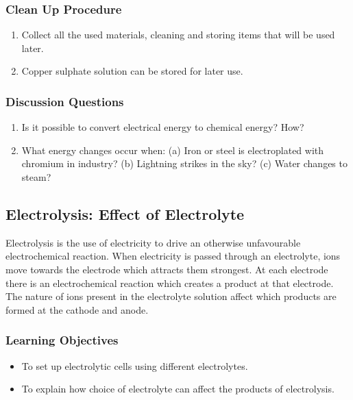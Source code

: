 \subsubsection*{Clean Up Procedure}
\begin{enumerate}
\item{Collect all the used materials, cleaning and storing items that will be used later.}
\item{Copper sulphate solution can be stored for later use.}
\end{enumerate}

\subsubsection*{Discussion Questions}
\begin{enumerate}
\item{Is it possible to convert electrical energy to chemical energy? How?}
\item{What energy changes occur when: (a) Iron or steel is electroplated with chromium in industry? (b) Lightning strikes in the sky? (c) Water changes to steam?}
\end{enumerate}


\subsection{Electrolysis: Effect of Electrolyte}

Electrolysis is the use of electricity to drive an otherwise unfavourable electrochemical reaction. When electricity is passed through an electrolyte, ions move towards the electrode which attracts them strongest. At each electrode there is an electrochemical reaction which creates a product at that electrode. The nature of ions present in the electrolyte solution affect which products are formed at the cathode and anode.

\subsubsection*{Learning Objectives}
\begin{itemize}
\item{To set up electrolytic cells using different electrolytes.}
\item{To explain how choice of electrolyte can affect the products of electrolysis.}
\end{itemize}

